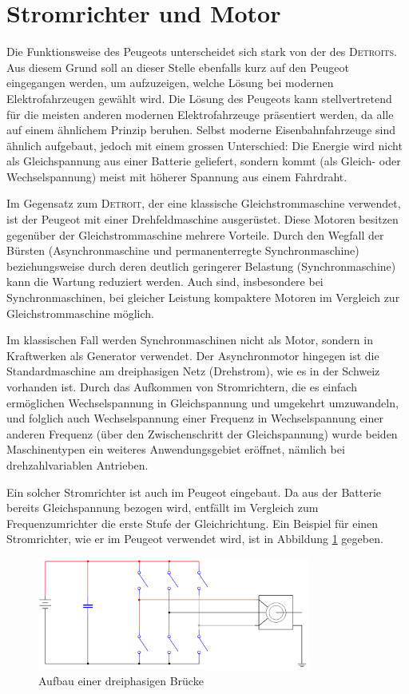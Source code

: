 \section{Stromrichter und Motor}
Die Funktionsweise des Peugeots unterscheidet sich stark von der des \textsc{Detroits}. Aus diesem Grund soll an dieser Stelle ebenfalls kurz auf den Peugeot eingegangen werden, um aufzuzeigen, welche Lösung bei modernen Elektrofahrzeugen gewählt wird. Die Lösung des Peugeots kann stellvertretend für die meisten anderen modernen Elektrofahrzeuge präsentiert werden, da alle auf einem ähnlichem Prinzip beruhen. Selbst moderne Eisenbahnfahrzeuge sind ähnlich aufgebaut, jedoch mit einem grossen Unterschied: Die Energie wird nicht als Gleichspannung aus einer Batterie geliefert, sondern kommt (als Gleich- oder Wechselspannung) meist mit höherer Spannung aus einem Fahrdraht.

Im Gegensatz zum \textsc{Detroit}, der eine klassische Gleichstrommaschine verwendet, ist der Peugeot mit einer Drehfeldmaschine ausgerüstet. Diese Motoren besitzen gegenüber der Gleichstrommaschine mehrere Vorteile. Durch den Wegfall der Bürsten (Asynchronmaschine und permanenterregte Synchronmaschine) beziehungsweise durch deren deutlich geringerer Belastung (Synchronmaschine) kann die Wartung reduziert werden. Auch sind, insbesondere bei Synchronmaschinen, bei gleicher Leistung kompaktere Motoren im Vergleich zur Gleichstrommaschine möglich.

Im klassischen Fall werden Synchronmaschinen nicht als Motor, sondern in Kraftwerken als Generator verwendet. Der Asynchronmotor hingegen ist die Standardmaschine am dreiphasigen Netz (Drehstrom), wie es in der Schweiz vorhanden ist. Durch das Aufkommen von Stromrichtern, die es einfach ermöglichen Wechselspannung in Gleichspannung und umgekehrt umzuwandeln, und folglich auch Wechselspannung einer Frequenz in Wechselspannung einer anderen Frequenz (über den Zwischenschritt der Gleichspannung) wurde beiden Maschinentypen ein weiteres Anwendungsgebiet eröffnet, nämlich bei drehzahlvariablen Antrieben.

Ein solcher Stromrichter ist auch im Peugeot eingebaut. Da aus der Batterie bereits Gleichspannung bezogen wird, entfällt im Vergleich zum Frequenzumrichter die erste Stufe der Gleichrichtung. Ein Beispiel für einen Stromrichter, wie er im Peugeot verwendet wird, ist in Abbildung \ref{fig:Bruecke} gegeben.

\begin{figure}[h!]
	\centering
		\includegraphics[width=0.80\textwidth]{images/Bruecke.PNG}
	\caption{Aufbau einer dreiphasigen Brücke}
	\label{fig:Bruecke}
\end{figure}

